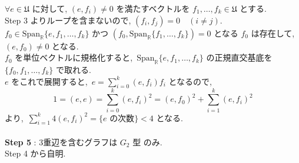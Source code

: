 \documentclass[uplatex,dvipdfmx]{jsarticle}
\begin{document}
\begin{myproof}
    $\forall e \in \mathfrak{U}$ に対して, $(e, f_i) \neq 0$ を満たすベクトルを $f_1, \dots, f_k \in \mathfrak{U}$ とする. \\
    Step 3 よりループを含まないので, $(f_i, f_j) = 0 \quad (i \neq j)$. \\
    $f_0 \in \mathrm{Span}_{\mathbb{R}}\{e, f_1, \dots, f_k\}$ かつ $(f_0, \mathrm{Span}_{\mathbb{R}}\{f_1, \dots, f_k\}) = 0$ となる $f_0$ は存在して, $(e, f_0) \neq 0$ となる. \\
    $f_0$ を単位ベクトルに規格化すると,~$\mathrm{Span}_{\mathbb{R}}\{e, f_1, \dots, f_k\}$ の正規直交基底を $\{f_0, f_1, \dots, f_k\}$ で取れる.\\
    $e$ をこれで展開すると,~$e = \sum_{i=0}^k (e, f_i)f_i$ となるので,
    \begin{equation*}
        1 = (e, e) = \sum_{i=0}^k (e, f_i)^2 = (e, f_0)^2 + \sum_{i=1}^k (e, f_i)^2
    \end{equation*}
    より,~$\sum_{i=1}^k 4(e, f_i)^2 = \{e \text{ の次数}\} < 4$ となる.\\\\
   \textbf{Step 5} : 3重辺を含むグラフは $G_2$ 型  のみ. \\
   Step 4 から自明.
\end{myproof}
\newpage
\end{document}
